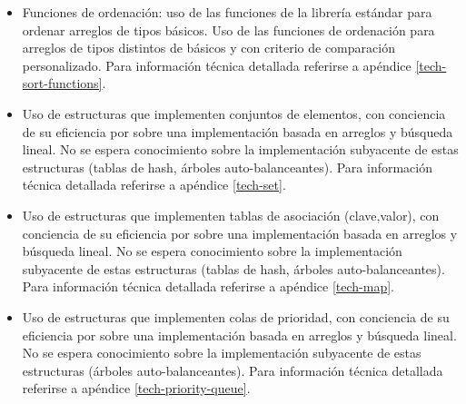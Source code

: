 \begin{itemize}
\item[\advanced]
Funciones de ordenación: uso de las funciones de la librería estándar para
ordenar arreglos de tipos básicos.
Uso de las funciones de ordenación para arreglos de tipos distintos de básicos
y con criterio de comparación personalizado.
Para información técnica detallada referirse a apéndice \ref{tech-sort-functions}.
\item[\advanced]
Uso de estructuras que implementen conjuntos de elementos, con conciencia de su
eficiencia por sobre una implementación basada en arreglos y búsqueda lineal.
No se espera conocimiento sobre la implementación subyacente de estas
estructuras (tablas de hash, árboles auto-balanceantes).
Para información técnica detallada referirse a apéndice \ref{tech-set}.
\item[\advanced]
Uso de estructuras que implementen tablas de asociación (clave,valor), con
conciencia de su eficiencia por sobre una implementación basada en arreglos y
búsqueda lineal.
No se espera conocimiento sobre la implementación subyacente de estas
estructuras (tablas de hash, árboles auto-balanceantes).
Para información técnica detallada referirse a apéndice \ref{tech-map}.
\item[\advanced]
Uso de estructuras que implementen colas de prioridad, con conciencia de su
eficiencia por sobre una implementación basada en arreglos y búsqueda lineal.
No se espera conocimiento sobre la implementación subyacente de estas
estructuras (árboles auto-balanceantes).
Para información técnica detallada referirse a apéndice \ref{tech-priority-queue}.
\end{itemize}


